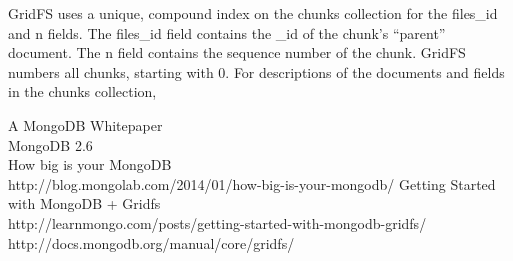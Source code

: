 \documentclass[a4paper,10pt]{scrartcl}
\begin{document}
GridFS uses a unique, compound index on the chunks collection for the files\_id and n fields. The files\_id field 
contains the \_id of the chunk’s “parent” document. The n field contains the sequence number of the chunk. GridFS 
numbers all chunks, starting with 0. For descriptions of the documents and fields in the chunks collection,
\newpage

\begin{thebibliography}{9}

  A MongoDB Whitepaper\\
  MongoDB 2.6\\
How big is your MongoDB\\
http://blog.mongolab.com/2014/01/how-big-is-your-mongodb/
Getting Started with MongoDB + Gridfs \\
http://learnmongo.com/posts/getting-started-with-mongodb-gridfs/
http://docs.mongodb.org/manual/core/gridfs/
\end{thebibliography}
\end{document}
